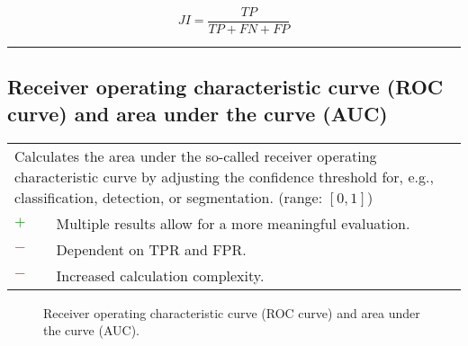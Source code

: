 \documentclass{article}
\begin{document}
\begin{equation}
	\textit{JI} = \dfrac{\textit{TP}}{\textit{TP} + \textit{FN} + \textit{FP}}
%
	\label{equation:JI}
\end{equation}

\hrule


\subsection[Receiver operating characteristic curve (ROC curve) and area under the curve (AUC)]{Receiver operating characteristic curve (ROC curve) and area under the curve (AUC) \cite{green1966signal, zweig1993receiver, fawcett2006introduction}}

\begin{table}[H]\centering
	\begin{tabular}{m{}m{}}
		\multicolumn{2}{m{0.95\textwidth}}{Calculates the area under the so-called receiver operating characteristic curve by adjusting the confidence threshold for, e.g., classification, detection, or segmentation. (range: $[0, 1]$)} \\
		\textcolor{Green}{$+$} & Multiple results allow for a more meaningful evaluation. \\
		\textcolor{Red}{$-$}   & Dependent on TPR and FPR. \\
		\textcolor{Red}{$-$}   & Increased calculation complexity.
	\end{tabular}
\end{table}

\begin{figure}[H]
	\centering


	\caption{Receiver operating characteristic curve (ROC curve) and area under the curve (AUC).}
	\label{figure:ROC_AUC}
\end{figure}
\end{document}
